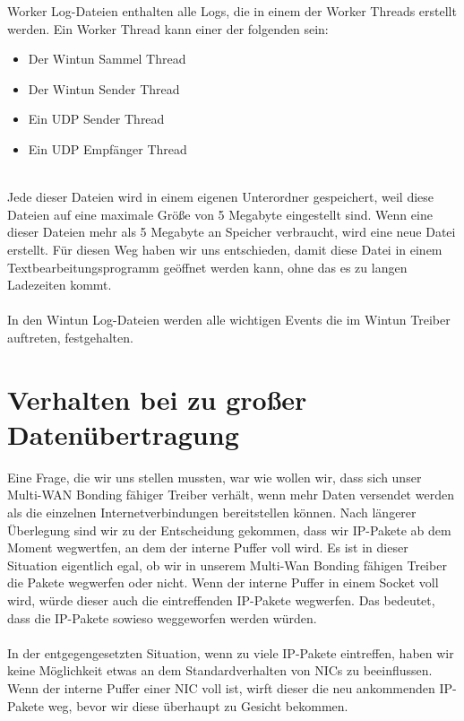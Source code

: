 \newpage
\noindent
Worker Log-Dateien enthalten alle Logs, die in einem der Worker Threads erstellt werden. Ein Worker Thread kann einer der folgenden sein:
\\
\begin{itemize}
    \item Der Wintun Sammel Thread
    \item Der Wintun Sender Thread
    \item Ein UDP Sender Thread
    \item Ein UDP Empfänger Thread
\end{itemize}
\ \\
Jede dieser Dateien wird in einem eigenen Unterordner gespeichert, weil diese Dateien auf eine maximale Größe von 5 Megabyte eingestellt sind. Wenn eine dieser Dateien mehr als 5 Megabyte an Speicher verbraucht, wird eine neue Datei erstellt. Für diesen Weg haben wir uns entschieden, damit diese Datei in einem Textbearbeitungsprogramm geöffnet werden kann, ohne das es zu langen Ladezeiten kommt.
\\\\
In den Wintun Log-Dateien werden alle wichtigen Events die im Wintun Treiber auftreten, festgehalten.
\section{Verhalten bei zu großer Datenübertragung}
Eine Frage, die wir uns stellen mussten, war wie wollen wir, dass sich unser Multi-WAN Bonding fähiger Treiber verhält, wenn mehr Daten versendet werden als die einzelnen Internetverbindungen bereitstellen können. Nach längerer Überlegung sind wir zu der Entscheidung gekommen, dass wir IP-Pakete ab dem Moment wegwertfen, an dem der interne Puffer voll wird. Es ist in dieser Situation eigentlich egal, ob wir in unserem Multi-Wan Bonding fähigen Treiber die Pakete wegwerfen oder nicht. Wenn der interne Puffer in einem Socket voll wird, würde dieser auch die eintreffenden IP-Pakete wegwerfen. Das bedeutet, dass die IP-Pakete sowieso weggeworfen werden würden.
\\\\
In der entgegengesetzten Situation, wenn zu viele IP-Pakete eintreffen, haben wir keine Möglichkeit etwas an dem Standardverhalten von NICs zu beeinflussen. Wenn der interne Puffer einer NIC voll ist, wirft dieser die neu ankommenden IP-Pakete weg, bevor wir diese überhaupt zu Gesicht bekommen.